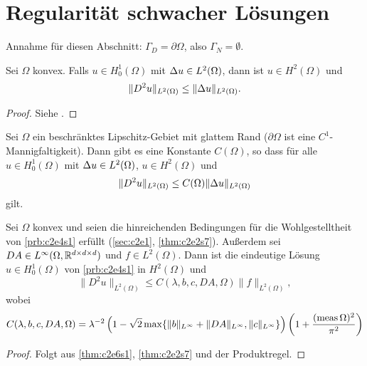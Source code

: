 \documentclass[../skript.tex]{subfiles}
\begin{document}
\section{Regularität schwacher Lösungen}\label{sec:c2e6}
Annahme für diesen Abschnitt: $\Gamma_D = \partial\Omega$, also $\Gamma_N = \emptyset$.
\begin{theorem}\label{thm:c2e6s1}
	Sei $\Omega$ konvex. Falls $u\in H^1_0(\Omega)$ mit $\Delta u\in L^2(\Omega)$, dann ist $u\in H^2(\Omega)$ und 
	\[
		\|D^2u\|_{L^2(\Omega)} \leq \|\Delta u\|_{L^2(\Omega)}.
	\]
\end{theorem}
\begin{proof}
	Siehe \cite{Grisvard}.
\end{proof}
\begin{theorem}\label{thm:c2e6s2}
	Sei $\Omega$ ein beschränktes Lipschitz-Gebiet mit glattem Rand ($\partial\Omega$ ist eine $C^1$-Mannig\-faltigkeit). Dann gibt es eine Konstante $C(\Omega)$, so dass für alle $u\in H^1_0(\Omega)$ mit $\Delta u\in L^2(\Omega)$, $u\in H^2(\Omega)$ und 
	\[
		\|D^2u\|_{L^2(\Omega)}\leq C(\Omega)\|\Delta u\|_{L^2(\Omega)}
	\]
	gilt.
\end{theorem}
\begin{theorem}\label{thm:c2e6s3}
	Sei $\Omega$ konvex und seien die hinreichenden Bedingungen für die Wohlgestelltheit von \cref{prb:c2e4s1} erfüllt (\cref{sec:c2e1}, \cref{thm:c2e2s7}). Außerdem sei $DA\in L^\infty(\Omega,\mathbb{R}^{d\times d\times d})$ und $f\in L^2(\Omega)$. Dann ist die eindeutige Lösung $u\in H^1_0(\Omega)$ von \cref{prb:c2e4s1} in $H^2(\Omega)$ und
	\[
		\|D^2u\|_{L^2(\Omega)} \leq C(\lambda,b,c,DA,\Omega)\|f\|_{L^2(\Omega)},
	\]
	wobei 
	\[
		C(\lambda,b,c,DA,\Omega) =  \lambda^{-2}\left(1-\sqrt{2}\max\{\|b\|_{L^\infty}+\|DA\|_{L^\infty},\|c\|_{L^\infty}\}\right)\left(1+\frac{(\operatorname{meas}{\Omega})^2}{\pi^2}\right)
	\]
\end{theorem}
\begin{proof}
	Folgt aus \cref{thm:c2e6s1}, \cref{thm:c2e2s7} und der Produktregel.
\end{proof}
\end{document}
